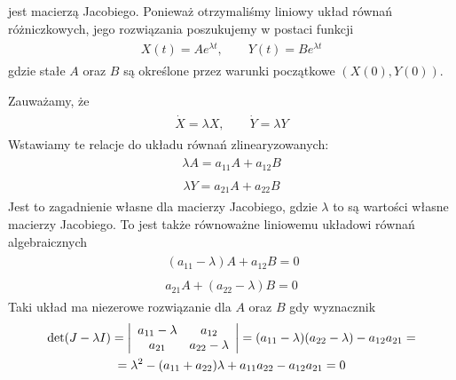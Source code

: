 \documentclass[a4paper,12pt,polish]{sphinxmanual}
\begin{document}
jest macierzą Jacobiego. Ponieważ otrzymaliśmy liniowy układ równań różniczkowych,  jego rozwiązania poszukujemy w postaci funkcji
\label{ch1/chI023:equation-eqn34}\begin{gather}
\begin{split}X(t) = A e^{\lambda t}, \qquad  Y(t) = B e^{\lambda t}\end{split}\label{ch1/chI023-eqn34}
\end{gather}
gdzie stałe $A$ oraz $B$ są określone przez warunki początkowe $(X(0), Y(0))$.

Zauważamy, że
\label{ch1/chI023:equation-eqn35}\begin{gather}
\begin{split} \dot X = \lambda X, \qquad \dot Y = \lambda  Y\end{split}\label{ch1/chI023-eqn35}
\end{gather}
Wstawiamy te relacje do  układu równań zlinearyzowanych:
\label{ch1/chI023:equation-eqn36}\begin{gather}
\begin{split}\lambda A = a_{11} A +  a_{12} B\end{split}\label{ch1/chI023-eqn36}
\end{gather}\label{ch1/chI023:equation-eqn37}\begin{gather}
\begin{split} \lambda  Y=  a_{21} A +  a_{22} B\end{split}\label{ch1/chI023-eqn37}
\end{gather}
Jest to zagadnienie własne dla macierzy Jacobiego, gdzie $\lambda$ to są wartości własne macierzy Jacobiego. To   jest także  równoważne liniowemu układowi równań algebraicznych
\label{ch1/chI023:equation-eqn38}\begin{gather}
\begin{split}\ (a_{11} - \lambda) A +  a_{12} B  = 0\end{split}\label{ch1/chI023-eqn38}
\end{gather}\label{ch1/chI023:equation-eqn39}\begin{gather}
\begin{split}a_{21} A +  (a_{22} -\lambda) B  = 0\end{split}\label{ch1/chI023-eqn39}
\end{gather}
Taki układ ma niezerowe rozwiązanie dla $A$ oraz $B$ gdy wyznacznik
\label{ch1/chI023:equation-eqn40}\begin{gather}
\begin{split}\det (J-\lambda I) = \left| \begin{array}{cc} a_{11} -\lambda &  a_{12} \\ a_{21}& a_{22} - \lambda  \end{array} \right| = (a_{11} -\lambda) ( a_{22} -\lambda) -a_{12} a_{21} =\end{split}\label{ch1/chI023-eqn40}\\\begin{split}= \lambda^2  - (a_{11} +a_{22} ) \lambda +a_{11} a_{22} -a_{12} a_{21} = 0\end{split}\notag
\end{gather}
\end{document}
